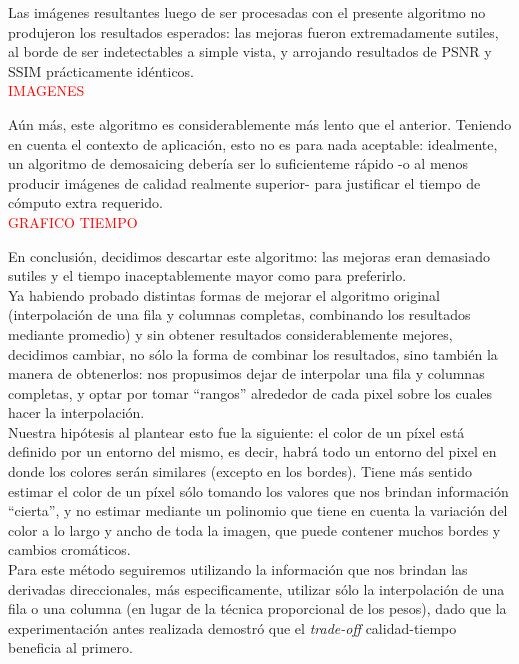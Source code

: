 \documentclass[a4paper]{article}
\begin{document}
Las imágenes resultantes luego de ser procesadas con el presente algoritmo no produjeron los resultados esperados: las mejoras fueron extremadamente sutiles, al borde de ser indetectables a simple vista, y arrojando resultados de PSNR y SSIM prácticamente idénticos. \\

\textcolor{red}{IMAGENES\\}

Aún más, este algoritmo es considerablemente más lento que el anterior. Teniendo en cuenta el contexto de aplicación, esto no es para nada aceptable: idealmente, un algoritmo de demosaicing debería ser lo suficienteme rápido -o al menos producir imágenes de calidad realmente superior- para justificar el tiempo de cómputo extra requerido.\\

\textcolor{red}{GRAFICO TIEMPO\\}

En conclusión, decidimos descartar este algoritmo: las mejoras eran demasiado sutiles y el tiempo inaceptablemente mayor como para preferirlo.\\

Ya habiendo probado distintas formas de mejorar el algoritmo original (interpolación de una fila y columnas completas, combinando los resultados mediante promedio) y sin obtener resultados considerablemente mejores, decidimos cambiar, no sólo la forma de combinar los resultados, sino también la manera de obtenerlos: nos propusimos dejar de interpolar una fila y columnas completas, y optar por tomar ``rangos'' alrededor de cada pixel sobre los cuales hacer la interpolación. \\

Nuestra hipótesis al plantear esto fue la siguiente: el color de un píxel está definido por un entorno del mismo, es decir, habrá todo un entorno del pixel en donde los colores serán similares (excepto en los bordes). Tiene más sentido estimar el color de un píxel sólo tomando los valores que nos brindan información ``cierta'', y no estimar mediante un polinomio que tiene en cuenta la variación del color a lo largo y ancho de toda la imagen, que puede contener muchos bordes y cambios cromáticos. \\

Para este método seguiremos utilizando la información que nos brindan las derivadas direccionales, más especificamente, utilizar sólo la interpolación de una fila o una columna (en lugar de la técnica proporcional de los pesos), dado que la experimentación antes realizada demostró que el \textit{trade-off} calidad-tiempo beneficia al primero. \\
\end{document}
